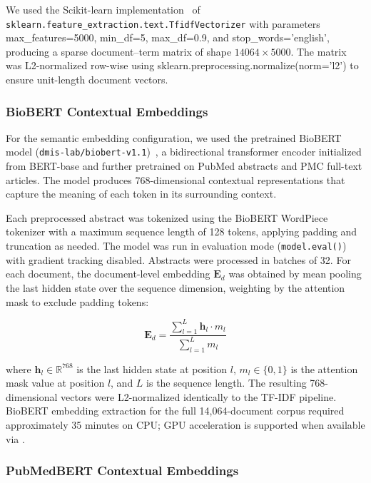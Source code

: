 \documentclass[a4paper,10pt,conference]{IEEEtran}
\begin{document}
We used the Scikit-learn implementation~\cite{ref23} of \texttt{sklearn.feature\_extraction.text.TfidfVectorizer} with parameters max\_features=5000, min\_df=5, max\_df=0.9, and stop\_words='english', producing a sparse document--term matrix of shape $14064 \times 5000$. The matrix was L2-normalized row-wise using sklearn.preprocessing.normalize(norm='l2') to ensure unit-length document vectors.

\subsubsection{BioBERT Contextual Embeddings}

For the semantic embedding configuration, we used the pretrained BioBERT model (\texttt{dmis-lab/biobert-v1.1})~\cite{ref1}, a bidirectional transformer encoder initialized from BERT-base and further pretrained on PubMed abstracts and PMC full-text articles. The model produces 768-dimensional contextual representations that capture the meaning of each token in its surrounding context.

Each preprocessed abstract was tokenized using the BioBERT WordPiece tokenizer with a maximum sequence length of 128 tokens, applying padding and truncation as needed. The model was run in evaluation mode (\texttt{model.eval()}) with gradient tracking disabled. Abstracts were processed in batches of 32. For each document, the document-level embedding $\mathbf{E}_d$ was obtained by mean pooling the last hidden state over the sequence dimension, weighting by the attention mask to exclude padding tokens:

\begin{equation}
\mathbf{E}_d = \frac{\sum_{l=1}^{L} \mathbf{h}_l \cdot m_l}{\sum_{l=1}^{L} m_l}
\end{equation}

where $\mathbf{h}_l \in \mathbb{R}^{768}$ is the last hidden state at position $l$, $m_l \in \{0,1\}$ is the attention mask value at position $l$, and $L$ is the sequence length. The resulting 768-dimensional vectors were L2-normalized identically to the TF-IDF pipeline. BioBERT embedding extraction for the full 14,064-document corpus required approximately 35 minutes on CPU; GPU acceleration is supported when available via .

\subsubsection{PubMedBERT Contextual Embeddings}
\end{document}
